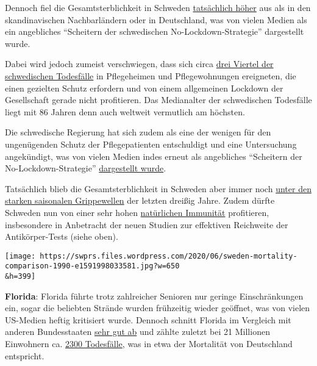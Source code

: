 Dennoch fiel die Gesamt­sterblichkeit in Schweden
\href{https://www.statista.com/statistics/1104709/coronavirus-deaths-worldwide-per-million-inhabitants/}{tatsächlich
höher} aus als in den skandinavischen Nachbarländern oder in
Deutschland, was von vielen Medien als ein angebliches ``Scheitern der
schwedischen No-Lockdown-Strategie'' dargestellt wurde.

Dabei wird jedoch zumeist verschwiegen, dass sich circa
\href{https://www.thelocal.se/20200525/swedish-death-toll-passes-4000-as-coronavirus-cases-in-care-homes-start-to-fall}{drei
Viertel der schwedischen Todesfälle} in Pflegeheimen und Pflegewohnungen
ereigneten, die einen gezielten Schutz erfordern und von einem
allgemeinen Lockdown der Gesellschaft gerade nicht profitieren. Das
Medianalter der schwedischen Todesfälle liegt mit 86 Jahren denn auch
weltweit vermutlich am höchsten.

Die schwedische Regierung hat sich zudem als eine der wenigen für den
ungenügenden Schutz der Pflegepatienten entschuldigt und eine
Untersuchung angekündigt, was von vielen Medien indes erneut als
angebliches ``Scheitern der No-Lockdown-Strategie''
\href{https://www.spiked-online.com/2020/06/08/no-sweden-has-not-changed-its-mind-about-lockdown/}{dargestellt
wurde}.

Tatsächlich blieb die Gesamtsterblichkeit in Schweden aber immer noch
\href{https://www.reuters.com/article/us-health-coronavirus-sweden-toll/coronavirus-pushes-swedish-deaths-to-highest-since-1993-in-april-idUSKBN22U1S4}{unter
den starken saisonalen Grippewellen} der letzten dreißig Jahre. Zudem
dürfte Schweden nun von einer sehr hohen
\href{https://medicalxpress.com/news/2020-05-stockholm-virus-antibodies-sweden.html}{natürlichen
Immunität} profitieren, insbesondere in Anbetracht der neuen Studien zur
effektiven Reichweite der Antikörper-Tests (siehe oben).

\texttt{[image: https://swprs.files.wordpress.com/2020/06/sweden-mortality-comparison-1990-e1591998033581.jpg?w=650\\\&h=399]}

\textbf{Florida}: Florida führte trotz zahlreicher Senioren nur geringe
Einschränkungen ein, sogar die beliebten Strände wurden frühzeitig
wieder geöffnet, was von vielen US-Medien heftig kritisiert wurde.
Dennoch schnitt Florida im Vergleich mit anderen Bundesstaaten
\href{https://www.statista.com/statistics/1109011/coronavirus-covid19-death-rates-us-by-state/}{sehr
gut ab} und zählte zuletzt bei 21 Millionen Einwohnern ca.
\href{https://www.clickorlando.com/news/local/2020/03/16/interactive-map-shows-florida-coronavirus-cases-in-real-time/}{2300
Todesfälle}, was in etwa der Mortalität von Deutschland entspricht.

